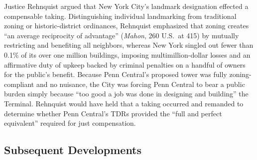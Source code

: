 \documentclass[12pt]{article}
\begin{document}
Justice Rehnquist argued that New York City's landmark designation effected a compensable taking. Distinguishing individual landmarking from traditional zoning or historic-district ordinances, Rehnquist emphasized that zoning creates ``an average reciprocity of advantage'' (\textit{Mahon}, 260 U.S.\ at 415) by mutually restricting and benefiting all neighbors, whereas New York singled out fewer than 0.1\% of its over one million buildings, imposing multimillion-dollar losses and an affirmative duty of upkeep backed by criminal penalties on a handful of owners for the public's benefit. Because Penn Central's proposed tower was fully zoning-compliant and no nuisance, the City was forcing Penn Central to bear a public burden simply because ``too good a job was done in designing and building'' the Terminal. Rehnquist would have held that a taking occurred and remanded to determine whether Penn Central's TDRs provided the ``full and perfect equivalent'' required for just compensation.

\subsection{Subsequent Developments}
\end{document}
